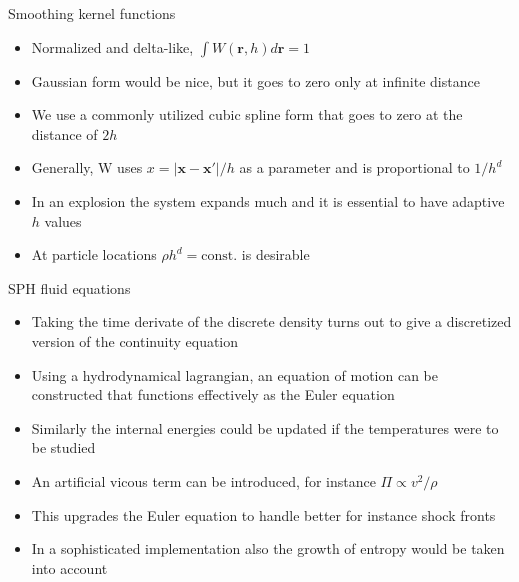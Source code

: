 \documentclass{beamer}
\begin{document}
\begin{frame}{Smoothing kernel functions}
\begin{itemize}

\item Normalized and delta-like, $\int W(\mathbf{r},h) d\mathbf{r} = 1$
\item Gaussian form would be nice, but it goes to zero only at infinite distance
\item We use a commonly utilized cubic spline form that goes to zero at the distance of $2h$
\item Generally, W uses $x = |\mathbf{x} - \mathbf{x}'|/h$ as a parameter and is proportional to $1/h^d$
\item In an explosion the system expands much and it is essential to have adaptive $h$ values
\item At particle locations $\rho h^d = \text{const.}$ is desirable

\end{itemize}
\end{frame}

\begin{frame}{SPH fluid equations}
\begin{itemize}

\item Taking the time derivate of the discrete density turns out to give a discretized version of the
continuity equation
\item Using a hydrodynamical lagrangian, an equation of motion can be constructed that functions effectively
as the Euler equation
\item Similarly the internal energies could be updated if the temperatures were to be studied
\item An artificial vicous term can be introduced, for instance $\Pi \propto v^2/\rho$
\item This upgrades the Euler equation to handle better for instance shock fronts
\item In a sophisticated implementation also the growth of entropy would be taken into account

\end{itemize}
\end{frame}
\end{document}

